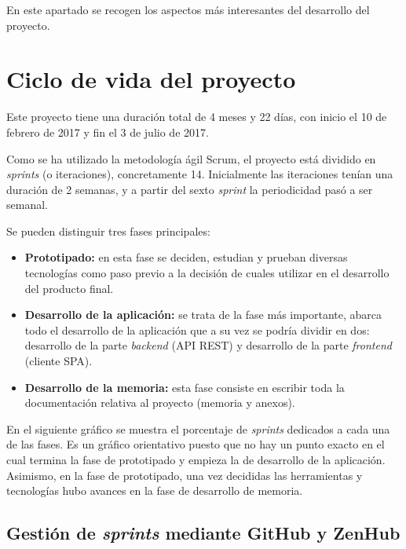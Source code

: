
En este apartado se recogen los aspectos más interesantes del desarrollo del proyecto.

\section{Ciclo de vida del proyecto}

Este proyecto tiene una duración total de 4 meses y 22 días, con inicio el 10 de febrero de 2017 y fin el 3 de julio de 2017.

Como se ha utilizado la metodología ágil Scrum, el proyecto está dividido en \emph{sprints} (o iteraciones), concretamente 14. Inicialmente las iteraciones tenían una duración de 2 semanas, y a partir del sexto \emph{sprint} la periodicidad pasó a ser semanal.

Se pueden distinguir tres fases principales:

\begin{itemize}
\tightlist
	\item \textbf{Prototipado:} en esta fase se deciden, estudian y prueban diversas tecnologías como paso previo a la decisión de cuales utilizar en el desarrollo del producto final.
	\item \textbf{Desarrollo de la aplicación:} se trata de la fase más importante, abarca todo el desarrollo de la aplicación que a su vez se podría dividir en dos: desarrollo de la parte \emph{backend} (API REST) y desarrollo de la parte \emph{frontend} (cliente SPA).
	\item \textbf{Desarrollo de la memoria:} esta fase consiste en escribir toda la documentación relativa al proyecto (memoria y anexos).
\end{itemize}

En el siguiente gráfico se muestra el porcentaje de \emph{sprints} dedicados a cada una de las fases. Es un gráfico orientativo puesto que no hay un punto exacto en el cual termina la fase de prototipado y empieza la de desarrollo de la aplicación. Asimismo, en la fase de prototipado, una vez decididas las herramientas y tecnologías hubo avances en la fase de desarrollo de memoria.


\subsection{Gestión de \emph{sprints} mediante GitHub y ZenHub}

